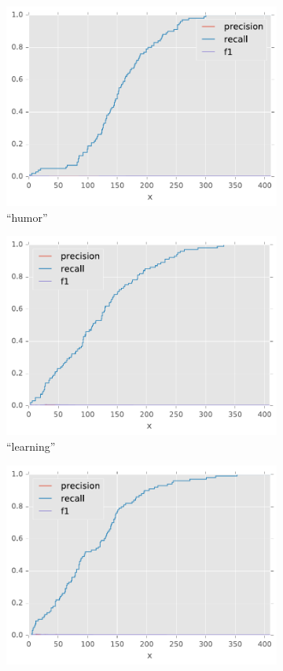 \begin{figure}[H]
\begin{subfigure}[t]{.4\textwidth}
\centering\includegraphics[]{figures/reddit-humor-f1.pdf}
\caption{``humor''}
\label{fig-reddit-humor-f1}
\end{subfigure}
\begin{subfigure}[t]{.4\textwidth}
\centering\includegraphics[]{figures/reddit-learning-f1.pdf}
\caption{``learning''}
\label{fig-reddit-learning-f1}
\end{subfigure}
\begin{subfigure}[t]{.4\textwidth}
\centering\includegraphics[]{figures/reddit-lifestyle-f1.pdf}

\end{subfigure}
\end{figure}
